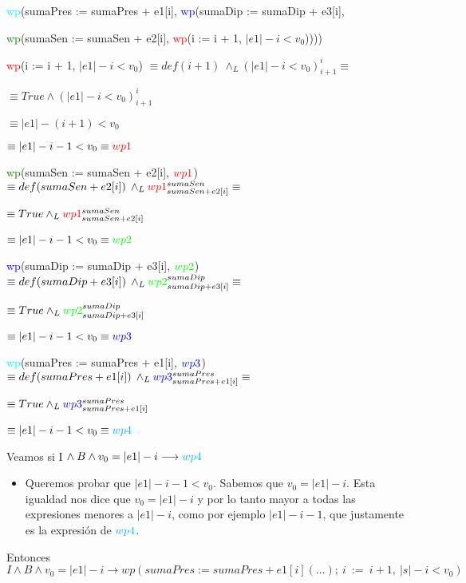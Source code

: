 \documentclass[10pt,a4paper]{article}
\begin{document}
\begin{enumerate}
\begin{enumerate}
\quad\quad \textcolor{cyan}{wp}(sumaPres := sumaPres + e1[i], \textcolor{blue}{wp}(sumaDip := sumaDip + e3[i],

\quad\quad \textcolor{green}{wp}(sumaSen := sumaSen + e2[i], \textcolor{red}{wp}(i := i + 1, $|e1| - i < v_0$))))

\quad\quad\quad \textcolor{red}{wp}(i := i + 1, $|e1| - i < v_0$) $\equiv def(i+1) \: \land_{L} (|e1| - i < v_0)^i_{i+1} \equiv$

\quad\quad\quad $\equiv True \land (|e1| - i < v_0)^i_{i+1}$

\quad\quad\quad $\equiv |e1| - (i+1) < v_0$

\quad\quad\quad $\equiv |e1| - i - 1 < v_0 \equiv \textcolor{red}{wp1}$

\quad\quad\quad \textcolor{green}{wp}(sumaSen := sumaSen + e2[i], $\textcolor{red}{wp1}$) $\equiv def(sumaSen + e2[i]) \: \land_{L} \textcolor{red}{wp1}^{sumaSen}_{sumaSen + e2[i]} \equiv$

\quad\quad\quad $\equiv True \land_L \textcolor{red}{wp1}^{sumaSen}_{sumaSen + e2[i]}$

\quad\quad\quad $\equiv |e1| - i - 1 < v_0 \equiv \textcolor{green}{wp2}$

\quad\quad\quad \textcolor{blue}{wp}(sumaDip := sumaDip + e3[i], $\textcolor{green}{wp2}$) $\equiv def(sumaDip + e3[i]) \: \land_{L} \textcolor{green}{wp2}^{sumaDip}_{sumaDip + e3[i]} \equiv$

\quad\quad\quad $\equiv True \land_L \textcolor{green}{wp2}^{sumaDip}_{sumaDip + e3[i]}$

\quad\quad\quad $\equiv |e1| - i - 1 < v_0 \equiv \textcolor{blue}{wp3}$

\quad\quad\quad \textcolor{cyan}{wp}(sumaPres := sumaPres + e1[i], $\textcolor{blue}{wp3}$) $\equiv def(sumaPres + e1[i]) \: \land_{L} \textcolor{blue}{wp3}^{sumaPres}_{sumaPres + e1[i]} \equiv$

\quad\quad\quad $\equiv True \land_L \textcolor{blue}{wp3}^{sumaPres}_{sumaPres + e1[i]}$

\quad\quad\quad $\equiv |e1| - i - 1 < v_0 \equiv \textcolor{cyan}{wp4}$

Veamos si I $\land \: B \land v_0 = |e1| - i \longrightarrow \textcolor{cyan}{wp4}$
\begin{itemize}
    \item Queremos probar que $|e1| - i - 1 < v_0$. Sabemos que $v_0 = |e1| - i$. Esta igualdad nos dice que $v_0 = |e1| - i$ y por lo tanto mayor a todas las expresiones menores a $|e1| - i$, como por ejemplo $|e1| - i - 1$, que justamente es la expresi\'on de $\textcolor{cyan}{wp4}$.
\end{itemize}
Entonces $I \land B \land v_0 = |e1| - i \longrightarrow wp(sumaPres := sumaPres + e1[i](\ldots);\: i \: := \: i + 1, \: |s| - i < v_0)$
\end{enumerate}
\end{enumerate}
\end{document}
